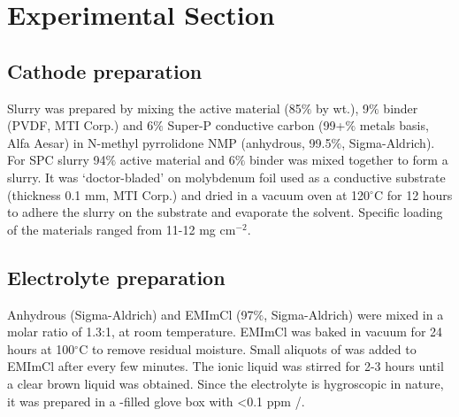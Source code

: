 \section{Experimental Section}
\subsection{Cathode preparation}
Slurry was prepared by mixing the active material (85$\%$ by wt.), 9$\%$ binder (PVDF, MTI Corp.) and 6$\%$ Super-P conductive carbon (99+$\%$ metals basis, Alfa Aesar) in N-methyl pyrrolidone NMP (anhydrous, 99.5$\%$, Sigma-Aldrich). For SPC slurry 94$\%$ active material and 6$\%$ binder was mixed together to form a slurry. It was ‘doctor-bladed’ on molybdenum foil used as a conductive substrate (thickness 0.1 mm, MTI Corp.) and dried in a vacuum oven at 120$^{\circ}$C for 12 hours to adhere the slurry on the substrate and evaporate the solvent. Specific loading of the materials ranged from 11-12 mg cm$^{-2}$. 
\subsection{Electrolyte preparation}
Anhydrous  (Sigma-Aldrich) and EMImCl (97$\%$, Sigma-Aldrich) were mixed in a molar ratio of 1.3:1, at room temperature. EMImCl was baked in vacuum for 24 hours at 100$^{\circ}$C to remove residual moisture. Small aliquots of  was added to EMImCl after every few minutes. The ionic liquid was stirred for 2-3 hours until a clear brown liquid was obtained. Since the electrolyte is hygroscopic in nature, it was prepared in a -filled glove box with <0.1 ppm /. 
